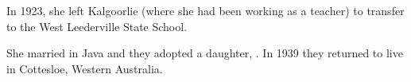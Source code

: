 
In 1923, she left Kalgoorlie (where she had been working as a teacher) to transfer to the West Leederville State School.\cite{VMkal}

She married  in Java\cite{LadiesSection} and they adopted a daughter, . In 1939 they returned to live in Cottesloe, Western Australia. 
